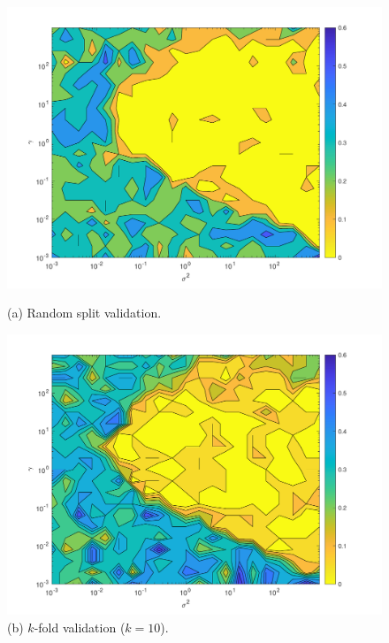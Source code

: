 \begingroup
\begin{figure}
\begin{minipage}{\linewidth}
    \centering\captionsetup[subfigure]{justification=centering}
    \includegraphics[width=\linewidth]{../src/figures/iris/validation_1}
    \caption*{(a) Random split validation.}
    \label{fig:5a}\par\vfill
    \includegraphics[width=\linewidth]{../src/figures/iris/validation_2}
    \caption*{(b) $k$-fold validation ($k=10$).}
    \label{fig:5b}

\end{minipage}
\end{figure}
